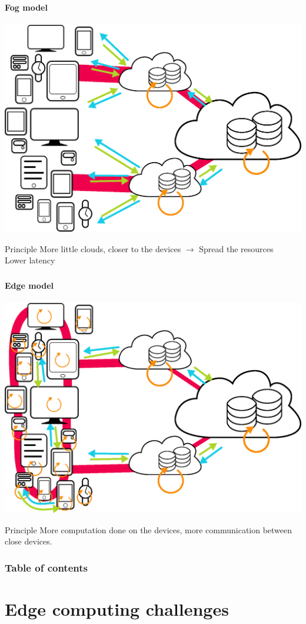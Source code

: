 \documentclass[utf8,xcolor=table, page number]{earlywinter}
\begin{document}
\begin{frame}
	\frametitle{\secname}
  \framesubtitle{Fog model}
  \begin{center}
    \includegraphics[width=0.6\linewidth]{fog.eps}
  \end{center}
  \begin{block}{Principle}
    More little clouds, closer to the devices $\to$ Spread the resources\\
    Lower latency
  \end{block}
\end{frame}
\begin{frame}
	\frametitle{\secname}
  \framesubtitle{Edge model}
  \begin{center}
    \includegraphics[width=0.6\linewidth]{edge.eps}
  \end{center}
  \begin{block}{Principle}
    More computation done on the devices, more communication between close devices.
  \end{block}
\end{frame}

  \begin{frame}
    \frametitle{Table of contents}
    \tableofcontents[]
  \end{frame}
  
  
\section{Edge computing challenges}
\end{document}

